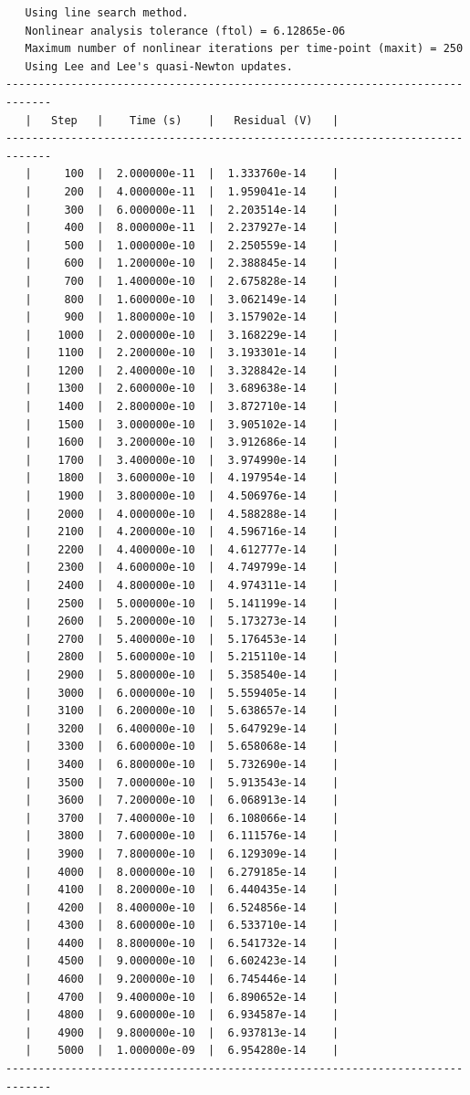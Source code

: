 \documentclass{article}
\begin{document}
{\begin{verbatim}
   Using line search method.
   Nonlinear analysis tolerance (ftol) = 6.12865e-06
   Maximum number of nonlinear iterations per time-point (maxit) = 250
   Using Lee and Lee's quasi-Newton updates.
-----------------------------------------------------------------------------
   |   Step   |    Time (s)    |   Residual (V)   |
-----------------------------------------------------------------------------
   |     100  |  2.000000e-11  |  1.333760e-14    |
   |     200  |  4.000000e-11  |  1.959041e-14    |
   |     300  |  6.000000e-11  |  2.203514e-14    |
   |     400  |  8.000000e-11  |  2.237927e-14    |
   |     500  |  1.000000e-10  |  2.250559e-14    |
   |     600  |  1.200000e-10  |  2.388845e-14    |
   |     700  |  1.400000e-10  |  2.675828e-14    |
   |     800  |  1.600000e-10  |  3.062149e-14    |
   |     900  |  1.800000e-10  |  3.157902e-14    |
   |    1000  |  2.000000e-10  |  3.168229e-14    |
   |    1100  |  2.200000e-10  |  3.193301e-14    |
   |    1200  |  2.400000e-10  |  3.328842e-14    |
   |    1300  |  2.600000e-10  |  3.689638e-14    |
   |    1400  |  2.800000e-10  |  3.872710e-14    |
   |    1500  |  3.000000e-10  |  3.905102e-14    |
   |    1600  |  3.200000e-10  |  3.912686e-14    |
   |    1700  |  3.400000e-10  |  3.974990e-14    |
   |    1800  |  3.600000e-10  |  4.197954e-14    |
   |    1900  |  3.800000e-10  |  4.506976e-14    |
   |    2000  |  4.000000e-10  |  4.588288e-14    |
   |    2100  |  4.200000e-10  |  4.596716e-14    |
   |    2200  |  4.400000e-10  |  4.612777e-14    |
   |    2300  |  4.600000e-10  |  4.749799e-14    |
   |    2400  |  4.800000e-10  |  4.974311e-14    |
   |    2500  |  5.000000e-10  |  5.141199e-14    |
   |    2600  |  5.200000e-10  |  5.173273e-14    |
   |    2700  |  5.400000e-10  |  5.176453e-14    |
   |    2800  |  5.600000e-10  |  5.215110e-14    |
   |    2900  |  5.800000e-10  |  5.358540e-14    |
   |    3000  |  6.000000e-10  |  5.559405e-14    |
   |    3100  |  6.200000e-10  |  5.638657e-14    |
   |    3200  |  6.400000e-10  |  5.647929e-14    |
   |    3300  |  6.600000e-10  |  5.658068e-14    |
   |    3400  |  6.800000e-10  |  5.732690e-14    |
   |    3500  |  7.000000e-10  |  5.913543e-14    |
   |    3600  |  7.200000e-10  |  6.068913e-14    |
   |    3700  |  7.400000e-10  |  6.108066e-14    |
   |    3800  |  7.600000e-10  |  6.111576e-14    |
   |    3900  |  7.800000e-10  |  6.129309e-14    |
   |    4000  |  8.000000e-10  |  6.279185e-14    |
   |    4100  |  8.200000e-10  |  6.440435e-14    |
   |    4200  |  8.400000e-10  |  6.524856e-14    |
   |    4300  |  8.600000e-10  |  6.533710e-14    |
   |    4400  |  8.800000e-10  |  6.541732e-14    |
   |    4500  |  9.000000e-10  |  6.602423e-14    |
   |    4600  |  9.200000e-10  |  6.745446e-14    |
   |    4700  |  9.400000e-10  |  6.890652e-14    |
   |    4800  |  9.600000e-10  |  6.934587e-14    |
   |    4900  |  9.800000e-10  |  6.937813e-14    |
   |    5000  |  1.000000e-09  |  6.954280e-14    |
-----------------------------------------------------------------------------


\end{verbatim}}
\end{document}
